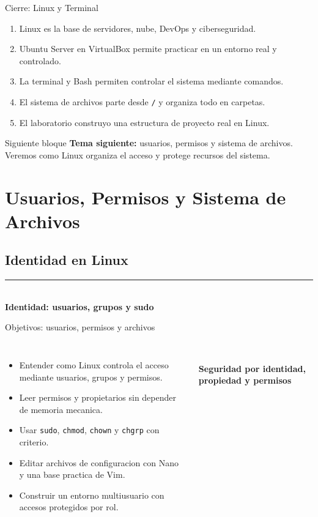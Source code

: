 \documentclass[aspectratio=169]{beamer}
\newcommand{\MainHeaderSlide}[2]{%
  \begin{frame}[plain]
    \hypertarget{#2}{}
    \vspace*{0.25\textheight}
    {\color{black}\rule{0.28\textwidth}{1.2pt}}\\[0.5em]
    {\usebeamerfont{title}\fontsize{34}{40}\selectfont\bfseries #1}
  \end{frame}
}
\begin{document}
\begin{frame}{Cierre: Linux y Terminal}
  \begin{enumerate}
    \item Linux es la base de servidores, nube, DevOps y ciberseguridad.
    \item Ubuntu Server en VirtualBox permite practicar en un entorno real y controlado.
    \item La terminal y Bash permiten controlar el sistema mediante comandos.
    \item El sistema de archivos parte desde \texttt{/} y organiza todo en carpetas.
    \item El laboratorio construyo una estructura de proyecto real en Linux.
  \end{enumerate}
  \vspace{0.3cm}
  \begin{alertblock}{Siguiente bloque}
    \textbf{Tema siguiente:} usuarios, permisos y sistema de archivos. Veremos como Linux organiza el acceso y protege recursos del sistema.
  \end{alertblock}
\end{frame}

\section{Usuarios, Permisos y Sistema de Archivos}

\subsection{Identidad en Linux}
\MainHeaderSlide{Identidad: usuarios, grupos y sudo}{idx-identidad-linux}

\begin{frame}{Objetivos: usuarios, permisos y archivos}
  \begin{columns}[c]
    \begin{itemize}
      \item Entender como Linux controla el acceso mediante usuarios, grupos y permisos.
      \item Leer permisos y propietarios sin depender de memoria mecanica.
      \item Usar \texttt{sudo}, \texttt{chmod}, \texttt{chown} y \texttt{chgrp} con criterio.
      \item Editar archivos de configuracion con Nano y una base practica de Vim.
      \item Construir un entorno multiusuario con accesos protegidos por rol.
    \end{itemize}
    \centering
    {\color{OTIred}\fontsize{52}{58}\selectfont\faUserShield}\\[0.25cm]
    {\large\textbf{Seguridad por identidad, propiedad y permisos}}
  \end{columns}
\end{frame}
\end{document}
